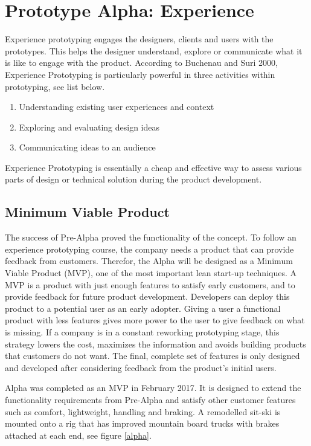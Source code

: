 \chapter{Prototype Alpha: Experience} 

Experience prototyping engages the designers, clients and users with the prototypes. This helps the designer understand, explore or communicate what it is like to engage with the product. According to Buchenau and Suri 2000, Experience Prototyping is particularly powerful in three activities within prototyping, see list below.

\vspace{0.5cm}
\begin{enumerate}
    \item Understanding existing user experiences and context
    \item Exploring and evaluating design ideas
    \item Communicating ideas to an audience
\end{enumerate}
\vspace{0.5cm}

Experience Prototyping is essentially a cheap and effective way to assess various parts of design or technical solution during the product development.\cite{christer}

\section{Minimum Viable Product}
The success of Pre-Alpha proved the functionality of the concept. To follow an experience prototyping course, the company needs a product that can provide feedback from customers. Therefor, the Alpha will be designed as a Minimum Viable Product (MVP), one of the most important lean start-up techniques. A MVP is a product with just enough features to satisfy early customers, and to provide feedback for future product development. Developers can deploy this product to a potential user as an early adopter. Giving a user a functional product with less features gives more power to the user to give feedback on what is missing. If a company is in a constant reworking prototyping stage, this strategy lowers the cost, maximizes the information and avoids building products that customers do not want. The final, complete set of features is only designed and developed after considering feedback from the product's initial users.
\cite{MVP}
\par
Alpha was completed as an MVP in February 2017. It is designed to extend the functionality requirements from Pre-Alpha and satisfy other customer features such as comfort, lightweight, handling and braking. A remodelled sit-ski is mounted onto a rig that has improved mountain board trucks with brakes attached at each end, see figure \ref{alpha}. 

